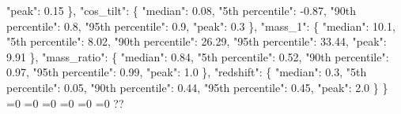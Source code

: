{{        "peak": 0.15%
      \}, %
      "cos\_tilt": \{%
        "median": 0.08, %
        "5th percentile": {-}0.87, %
        "90th percentile": 0.8, %
        "95th percentile": 0.9, %
        "peak": 0.3%
      \}, %
      "mass\_1": \{%
        "median": 10.1, %
        "5th percentile": 8.02, %
        "90th percentile": 26.29, %
        "95th percentile": 33.44, %
        "peak": 9.91%
      \}, %
      "mass\_ratio": \{%
        "median": 0.84, %
        "5th percentile": 0.52, %
        "90th percentile": 0.97, %
        "95th percentile": 0.99, %
        "peak": 1.0%
      \}, %
      "redshift": \{%
        "median": 0.3, %
        "5th percentile": 0.05, %
        "90th percentile": 0.44, %
        "95th percentile": 0.45, %
        "peak": 2.0%
      \}%
    \}}%
  \else%
    \ifnum{}=0%
      \let\MagTruncnormIndTiltIsotropicTruncnormNid@II@out\MagTruncnormIndTiltIsotropicTruncnormNid@XXX%
    \else%
      \ifnum{}=0%
      \let\MagTruncnormIndTiltIsotropicTruncnormNid@II@out\MagTruncnormIndTiltIsotropicTruncnormNid@XXXI%
    \else%
      \ifnum{}=0%
      \let\MagTruncnormIndTiltIsotropicTruncnormNid@II@out\MagTruncnormIndTiltIsotropicTruncnormNid@XXXII%
    \else%
      \ifnum{}=0%
      \let\MagTruncnormIndTiltIsotropicTruncnormNid@II@out\MagTruncnormIndTiltIsotropicTruncnormNid@XXXIII%
    \else%
      \ifnum{}=0%
      \let\MagTruncnormIndTiltIsotropicTruncnormNid@II@out\MagTruncnormIndTiltIsotropicTruncnormNid@XXXIV%
    \else%
      \ifnum{}=0%
      \let\MagTruncnormIndTiltIsotropicTruncnormNid@II@out\MagTruncnormIndTiltIsotropicTruncnormNid@XXXV%
    \else%
      \def\MagTruncnormIndTiltIsotropicTruncnormNid@II@out{%
    ??}%
    \fi\fi\fi\fi\fi\fi
  \fi
  \MagTruncnormIndTiltIsotropicTruncnormNid@II@out
}\newcommand\MagTruncnormIndTiltIsotropicTruncnormNid@III[1][all]{%
  \ifnum\pdfstrcmp{#1}{all}=0%
    \def\MagTruncnormIndTiltIsotropicTruncnormNid@III@out{%
    \{%
      "median": 1.88, %
      "5th percentile": {-}0.2, %
      "95th percentile": 3.1, %
      "error plus": 1.22, %
      "error minus": 2.08%
    \}}%
  \else%
    \ifnum\pdfstrcmp{#1}{median}=0%
      \def\MagTruncnormIndTiltIsotropicTruncnormNid@III@out{%
    1.88}%
    \else%
      \ifnum\pdfstrcmp{#1}{5th percentile}=0%
      \def\MagTruncnormIndTiltIsotropicTruncnormNid@III@out{%
    {-}0.2}%
    \else%
      \ifnum\pdfstrcmp{#1}{95th percentile}=0%
      \def\MagTruncnormIndTiltIsotropicTruncnormNid@III@out{%
    3.1}%
    \else%
      \ifnum\pdfstrcmp{#1}{error plus}=0%
}
